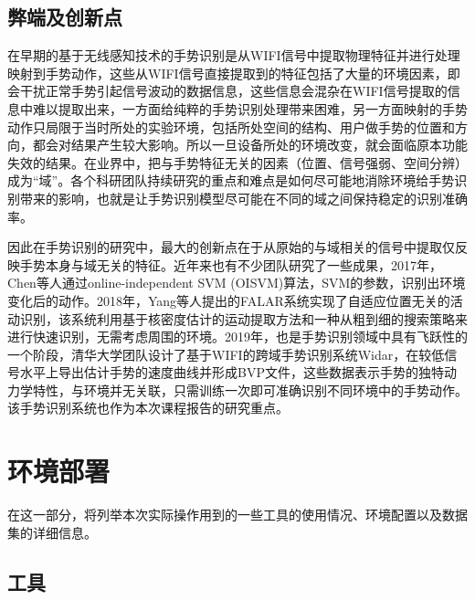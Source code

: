 \documentclass[a4paper]{article}
\begin{document}
  \subsection{弊端及创新点}
  在早期的基于无线感知技术的手势识别是从WIFI信号中提取物理特征并进行处理映射到手势动作，这些从WIFI信号直接提取到的特征包括了大量的环境因素，即会干扰正常手势引起信号波动的数据信息，这些信息会混杂在WIFI信号提取的信息中难以提取出来，一方面给纯粹的手势识别处理带来困难，另一方面映射的手势动作只局限于当时所处的实验环境，包括所处空间的结构、用户做手势的位置和方向，都会对结果产生较大影响。所以一旦设备所处的环境改变，就会面临原本功能失效的结果。在业界中，把与手势特征无关的因素（位置、信号强弱、空间分辨）成为“域”。各个科研团队持续研究的重点和难点是如何尽可能地消除环境给手势识别带来的影响，也就是让手势识别模型尽可能在不同的域之间保持稳定的识别准确率。\par
  因此在手势识别的研究中，最大的创新点在于从原始的与域相关的信号中提取仅反映手势本身与域无关的特征。近年来也有不少团队研究了一些成果，2017年，Chen等人通过online-independent SVM (OISVM)算法，SVM的参数，识别出环境变化后的动作。2018年，Yang等人提出的FALAR系统实现了自适应位置无关的活动识别，该系统利用基于核密度估计的运动提取方法和一种从粗到细的搜索策略来进行快速识别，无需考虑周围的环境。2019年，也是手势识别领域中具有飞跃性的一个阶段，清华大学团队设计了基于WIFI的跨域手势识别系统Widar，在较低信号水平上导出估计手势的速度曲线并形成BVP文件，这些数据表示手势的独特动力学特性，与环境并无关联，只需训练一次即可准确识别不同环境中的手势动作。该手势识别系统也作为本次课程报告的研究重点。
  \section{环境部署}
  在这一部分，将列举本次实际操作用到的一些工具的使用情况、环境配置以及数据集的详细信息。
  \subsection{工具}
\end{document}
